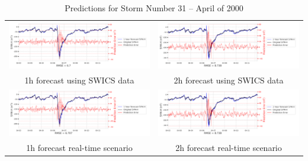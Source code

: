 \documentclass[draft,sw]{agutexSI2019}
\begin{document}
\begin{table}
\centering
\begin{tabular}{cc}
\includegraphics[width=0.49\linewidth]{paper_plots_shade/1h_swics/1h_swics_storm_31.png}
&
\includegraphics[width=0.49\linewidth]{paper_plots_shade/2h_swics/2h_swics_storm_31.png}
\\
1h forecast using SWICS data & 2h forecast using SWICS data
\vspace*{12pt}
\\
\includegraphics[width=0.49\linewidth]{paper_plots_shade/1h_rt/1h_rt_storm_31.png}
&
\includegraphics[width=0.49\linewidth]{paper_plots_shade/2h_rt/2h_rt_storm_31.png}
\\
1h forecast real-time scenario & 2h forecast real-time scenario 
\vspace*{12pt}
\\
\end{tabular}
\caption{Predictions for Storm Number 31 -- April of 2000}
\label{storm-31}
\end{table}
\end{document}
